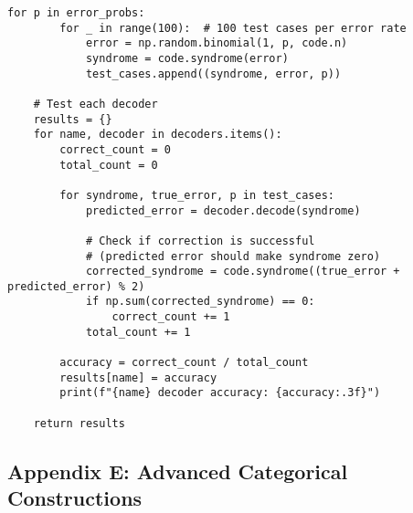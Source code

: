 \documentclass[12pt,a4paper]{article}
\begin{document}
\begin{lstlisting}[style=python,caption=Quantum circuit implementations using Qiskit]
    for p in error_probs:
        for _ in range(100):  # 100 test cases per error rate
            error = np.random.binomial(1, p, code.n)
            syndrome = code.syndrome(error)
            test_cases.append((syndrome, error, p))
    
    # Test each decoder
    results = {}
    for name, decoder in decoders.items():
        correct_count = 0
        total_count = 0
        
        for syndrome, true_error, p in test_cases:
            predicted_error = decoder.decode(syndrome)
            
            # Check if correction is successful
            # (predicted error should make syndrome zero)
            corrected_syndrome = code.syndrome((true_error + predicted_error) % 2)
            if np.sum(corrected_syndrome) == 0:
                correct_count += 1
            total_count += 1
        
        accuracy = correct_count / total_count
        results[name] = accuracy
        print(f"{name} decoder accuracy: {accuracy:.3f}")
    
    return results
\end{lstlisting}

\subsection{Appendix E: Advanced Categorical Constructions}
\end{document}
